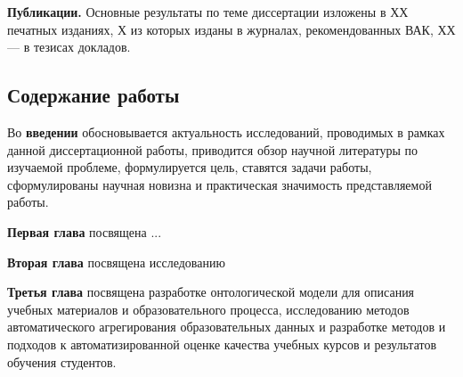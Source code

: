 
\textbf{Публикации.} Основные результаты по теме диссертации изложены в ХХ печатных изданиях, Х из которых изданы в журналах, рекомендованных ВАК, ХХ --- в тезисах докладов.


\subsection*{\Large Содержание работы}
Во \textbf{введении} обосновывается актуальность исследований, проводимых в рамках данной диссертационной работы, приводится обзор научной литературы по изучаемой проблеме, формулируется цель, ставятся задачи работы, сформулированы научная новизна и практическая значимость представляемой работы.

\textbf{Первая глава} посвящена ...



\textbf{Вторая глава} посвящена исследованию 

\textbf{Третья глава} посвящена разработке онтологической модели для описания учебных материалов и образовательного процесса, исследованию методов автоматического агрегирования образовательных данных и разработке методов и подходов к автоматизированной оценке качества учебных курсов и результатов обучения студентов.   


